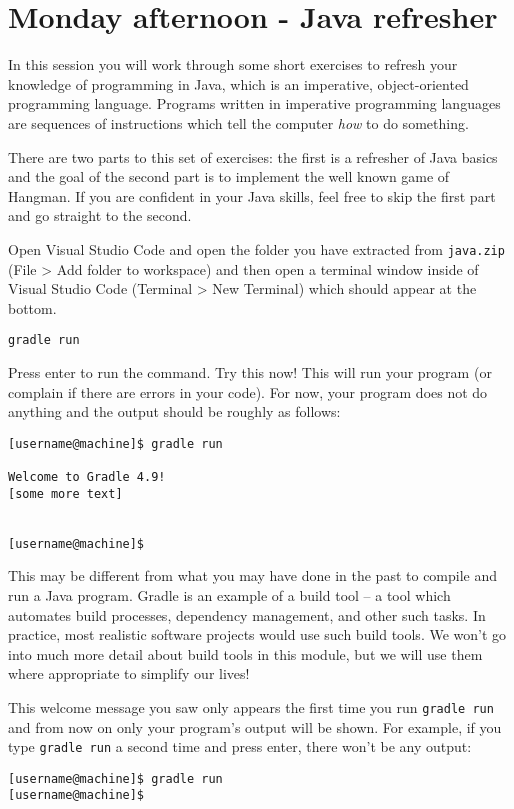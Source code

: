 \section{Monday afternoon - Java refresher}	

In this session you will work through some short exercises to refresh your knowledge of programming in Java, which is an imperative, object-oriented programming language. Programs written in imperative programming languages are sequences of instructions which tell the computer \emph{how} to do something.

There are two parts to this set of exercises: the first is a refresher of Java basics and the goal of the second part is to implement the well known game of Hangman. If you are confident in your Java skills, feel free to skip the first part and go straight to the second.

Open Visual Studio Code and open the folder you have extracted from \texttt{java.zip} (File > Add folder to workspace) and then open a terminal window inside of Visual Studio Code (Terminal > New Terminal) which should appear at the bottom. 

\taskLine

\begin{verbatim}
gradle run
\end{verbatim}
Press enter to run the command. Try this now! This will run your program (or complain if there are errors in your code). For now, your program does not do anything and the output should be roughly as follows:
\begin{verbatim}
[username@machine]$ gradle run 

Welcome to Gradle 4.9!
[some more text]


[username@machine]$ 
\end{verbatim}
This may be different from what you may have done in the past to compile and run a Java program. Gradle is an example of a build tool -- a tool which automates build processes, dependency management, and other such tasks. In practice, most realistic software projects would use such build tools. We won't go into much more detail about build tools in this module, but we will use them where appropriate to simplify our lives!
\taskLine

This welcome message you saw only appears the first time you run \texttt{gradle run} and from now on only your program's output will be shown. For example, if you type \texttt{gradle run} a second time and press enter, there won't be any output:
\begin{verbatim}
[username@machine]$ gradle run 
[username@machine]$ 
\end{verbatim}

